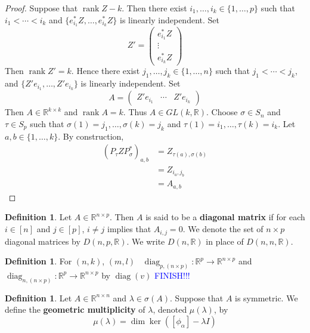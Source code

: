 \documentclass{book}
\theoremstyle{definition}
\newtheorem{defn}[definition]{Definition}
\newcommand{\al}{\alpha}
\newcommand{\lam}{\lambda}
\newcommand{\sig}{\sigma}
\newcommand{\R}{\mathbb{R}}
\DeclareMathOperator{\rnk}{rank}
\DeclareMathOperator{\diag}{\text{diag}}
\DeclareMathOperator*{\0}{\mbf{0}}
\DeclareMathOperator*{\1}{\mbf{1}}
\newcommand{\tbf}[1]{\textbf{#1}}
\newcommand{\tcb}[1]{\textcolor{blue}{#1}}
\begin{document}
	\begin{proof}
		Suppose that $\rnk Z - k$. Then there exist $i_1, \ldots, i_k \in \{1, \ldots, p\}$ such that $i_1 < \cdots < i_k$ and $\{	e_{i_1}^* Z, \ldots, e_{i_k}^* Z \}$ is linearly independent. Set 
		$$ Z' = 
		\begin{pmatrix}
			e_{i_1}^* Z \\
			\vdots \\
			e_{i_k}^* Z 
		\end{pmatrix}
		$$
		Then $\rnk Z' = k$. Hence there exist $j_1, \ldots, j_k \in \{1, \ldots, n\}$ such that $j_1 < \cdots < j_k$, and $\{Z' e_{i_1}, \ldots, Z' e_{i_k} \}$ is linearly independent. Set 
		$$ A = 
		\begin{pmatrix}
			Z' e_{i_1} & \cdots & Z' e_{i_k}
		\end{pmatrix}
		$$
		Then $A \in \R^{k \times k}$ and $\rnk A = k$. Thus $A \in GL(k, \R)$. Choose $\sig \in S_n$ and $\tau \in S_p$ such that $\sig(1) = j_1, \ldots, \sig(k) = j_k$ and $\tau(1) = i_1, \ldots, \tau(k) = i_k$. Let $a,b \in \{1, \ldots, k\}$. By construction, 
		\begin{align*}
			(P_{\tau} Z P^*_{\sig})_{a, b}
			& = Z_{\tau(a), \sig(b)} \\
			& = Z_{i_a, j_b} \\
			& = A_{a, b}
		\end{align*}
		\end{proof}

	\begin{defn}
		Let $A \in \R^{n \times p}$. Then $A$ is said to be a \tbf{diagonal matrix} if for each $i \in [n]$ and $j \in [p]$, $i \neq j$ implies that $A_{i,j} = 0$. We denote the set of $n \times p$ diagonal  matrices by $D(n, p, \R)$. We write $D(n, \R)$ in place of $D(n, n, \R)$.
	\end{defn}

	\begin{defn}
		For $(n, k)$, $(m, l)$ \ $\diag_{p, (n \times p)} : \R^p \rightarrow \R^{n \times p}$ and $\diag_{n, (n \times p)} : \R^p \rightarrow \R^{n \times p}$  by $\diag(v)$
		\tcb{FINISH!!!}
	\end{defn}


	\begin{defn}
		Let $A \in \R^{n \times n}$ and $\lam \in \sig(A)$. Suppose that $A$ is symmetric. We define the \tbf{geometric multiplicity} of $\lam$, denoted $\mu(\lam)$, by 
		$$\mu(\lam) = \dim \ker ([\phi_{\al}] - \lam I)$$
	\end{defn}
\end{document}
